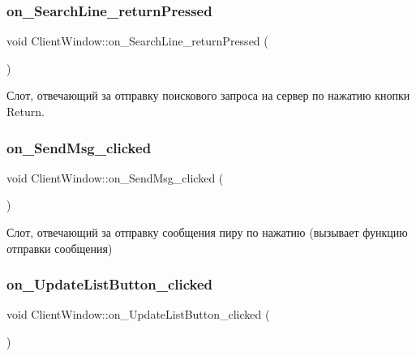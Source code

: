 \subsubsection{\texorpdfstring{on\+\_\+\+Search\+Line\+\_\+return\+Pressed}{on\_SearchLine\_returnPressed}}
{\footnotesize\ttfamily void Client\+Window\+::on\+\_\+\+Search\+Line\+\_\+return\+Pressed (\begin{DoxyParamCaption}{ }\end{DoxyParamCaption})\hspace{0.3cm}{\ttfamily [slot]}}



Слот, отвечающий за отправку поискового запроса на сервер по нажатию кнопки Return. 

\mbox{\label{class_client_window_a3868f97e58d97ea716137c52e50b968d}} 
\subsubsection{\texorpdfstring{on\+\_\+\+Send\+Msg\+\_\+clicked}{on\_SendMsg\_clicked}}
{\footnotesize\ttfamily void Client\+Window\+::on\+\_\+\+Send\+Msg\+\_\+clicked (\begin{DoxyParamCaption}{ }\end{DoxyParamCaption})\hspace{0.3cm}{\ttfamily [slot]}}



Слот, отвечающий за отправку сообщения пиру по нажатию (вызывает функцию отправки сообщения) 

\mbox{\label{class_client_window_a03213f4bad0ff25e75eeb617b61d5bdf}} 
\subsubsection{\texorpdfstring{on\+\_\+\+Update\+List\+Button\+\_\+clicked}{on\_UpdateListButton\_clicked}}
{\footnotesize\ttfamily void Client\+Window\+::on\+\_\+\+Update\+List\+Button\+\_\+clicked (\begin{DoxyParamCaption}{ }\end{DoxyParamCaption})\hspace{0.3cm}{\ttfamily [slot]}}



